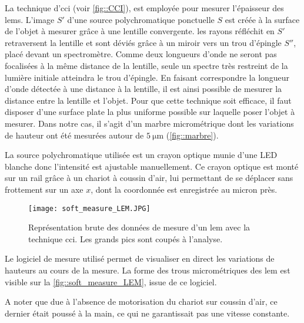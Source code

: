                     La technique d'\gls{cci} (voir \autoref{fig::CCI}), est employée pour mesurer l'épaisseur des \glspl{lem}. L'image $S'$ d'une source polychromatique ponctuelle $S$ est créée à la surface de l'objet à mesurer grâce à une lentille convergente. les rayons réfléchit en $S'$ retraversent la lentille et sont déviés grâce à un miroir vers un trou d'épingle $S''$, placé devant un spectromètre. Comme deux longueurs d'onde ne seront pas focalisées à la même distance de la lentille, seule un spectre très restreint de la lumière initiale atteindra le trou d'épingle. En faisant correspondre la longueur d'onde détectée à une distance à la lentille, il est ainsi possible de mesurer la distance entre la lentille et l'objet.%
                    Pour que cette technique soit efficace, il faut disposer d'une surface plate la plus uniforme possible sur laquelle poser l'objet à mesurer. Dans notre cas, il s'agit d'un marbre micrométrique dont les variations de hauteur ont été mesurées autour de $\SI{5}{\micro\meter}$ (\autoref{fig::marbre}).
                    
                    La source polychromatique utilisée est un crayon optique munie d'une LED blanche donc l'intensité est ajustable manuellement. Ce crayon optique est monté sur un rail grâce à un chariot à coussin d'air, lui permettant de se déplacer sans frottement sur un axe $x$, dont la coordonnée est enregistrée au micron près.
                    
                    \begin{wrapfigure}{r}{0.4\textwidth}
                        \texttt{[image: soft\_measure\_LEM.JPG]}
                        \caption[Représentation brute des données de mesure d'un \gls{lem} avec la technique \gls{cci}.]{Représentation brute des données de mesure d'un \gls{lem} avec la technique \gls{cci}. Les grands pics sont coupés à l'analyse.}
                        \label{fig::soft_measure_LEM}
                    \end{wrapfigure}
                    Le logiciel de mesure utilisé permet de visualiser en direct les variations de hauteurs au cours de la mesure. La forme des trous micrométriques des \gls{lem} est visible sur la \autoref{fig::soft_measure_LEM}, issue de ce logiciel. 
                    
                    A noter que due à l'absence de motorisation du chariot sur coussin d'air, ce dernier était poussé à la main, ce qui ne garantissait pas une vitesse constante.
                    
